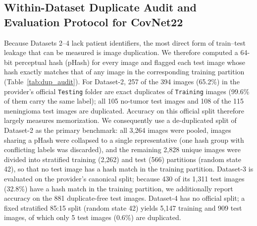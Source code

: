 \documentclass[a4paper,fleqn]{cas-sc}
\begin{document}
\subsection{Within-Dataset Duplicate Audit and Evaluation Protocol for CovNet22}
\label{sec:dup_audit}

Because Datasets 2--4 lack patient identifiers, the most direct form of train--test leakage that can be measured is image duplication. We therefore computed a 64-bit perceptual hash (pHash) for every image and flagged each test image whose hash exactly matches that of any image in the corresponding training partition (Table~\ref{tab:dup_audit}). For Dataset-2, 257 of the 394 images (65.2\%) in the provider's official \texttt{Testing} folder are exact duplicates of \texttt{Training} images (99.6\% of them carry the same label); all 105 no-tumor test images and 108 of the 115 meningioma test images are duplicated. Accuracy on this official split therefore largely measures memorization. We consequently use a de-duplicated split of Dataset-2 as the primary benchmark: all 3,264 images were pooled, images sharing a pHash were collapsed to a single representative (one hash group with conflicting labels was discarded), and the remaining 2,828 unique images were divided into stratified training (2,262) and test (566) partitions (random state 42), so that no test image has a hash match in the training partition. Dataset-3 is evaluated on the provider's canonical split; because 430 of its 1,311 test images (32.8\%) have a hash match in the training partition, we additionally report accuracy on the 881 duplicate-free test images. Dataset-4 has no official split; a fixed stratified 85:15 split (random state 42) yields 5,147 training and 909 test images, of which only 5 test images (0.6\%) are duplicated.

\begin{table}[!htbp]
\centering
\caption{Within-dataset train--test duplicate audit (64-bit pHash, exact match) and the evaluation splits used for CovNet22}
\label{tab:dup_audit}
\small
{}
\end{table}
\end{document}
